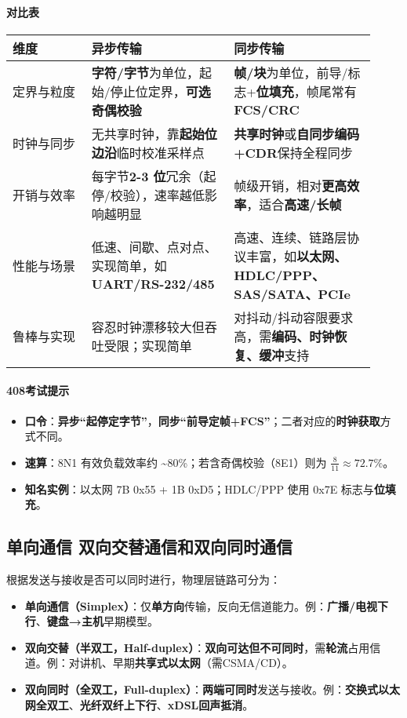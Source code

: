 \documentclass[lang=cn,newtx,10pt,scheme=chinese]{../../elegantbook}
\begin{document}
\paragraph{对比表}
{\small\begin{longtable}{|p{0.20\linewidth}|p{0.36\linewidth}|p{0.36\linewidth}|}
\hline
    	\textbf{维度} & \textbf{异步传输} & \textbf{同步传输} \\
\hline
定界与粒度 & \textbf{字符/字节}为单位，起始/停止位定界，\textbf{可选奇偶校验} & \textbf{帧/块}为单位，前导/标志+\textbf{位填充}，帧尾常有\textbf{FCS/CRC} \\
\hline
时钟与同步 & 无共享时钟，靠\textbf{起始位边沿}临时校准采样点 & \textbf{共享时钟}或\textbf{自同步编码+CDR}保持全程同步 \\
\hline
开销与效率 & 每字节\textbf{2-3 位}冗余（起停/校验），速率越低影响越明显 & 帧级开销，相对\textbf{更高效率}，适合\textbf{高速/长帧} \\
\hline
性能与场景 & 低速、间歇、点对点、实现简单，如\textbf{UART/RS-232/485} & 高速、连续、链路层协议丰富，如\textbf{以太网、HDLC/PPP、SAS/SATA、PCIe} \\
\hline
鲁棒与实现 & 容忍时钟漂移较大但吞吐受限；实现简单 & 对抖动/抖动容限要求高，需\textbf{编码、时钟恢复、缓冲}支持 \\
\hline
\end{longtable}}

\paragraph{408考试提示}
\begin{itemize}
    \item \textbf{口令}：\textbf{异步“起停定字节”}，\textbf{同步“前导定帧+FCS”}；二者对应的\textbf{时钟获取}方式不同。
    \item \textbf{速算}：8N1 有效负载效率约 \textasciitilde80\%；若含奇偶校验（8E1）则为 $\tfrac{8}{11}\approx72.7\%$。
    \item \textbf{知名实例}：以太网 7B 0x55 + 1B 0xD5；HDLC/PPP 使用 0x7E 标志与\textbf{位填充}。
\end{itemize}

\subsection{单向通信 双向交替通信和双向同时通信}
根据发送与接收是否可以同时进行，物理层链路可分为：
\begin{itemize}
    \item \textbf{单向通信（Simplex）}：仅\textbf{单方向}传输，反向无信道能力。例：\textbf{广播/电视下行}、\textbf{键盘→主机}早期模型。
    \item \textbf{双向交替（半双工，Half-duplex）}：\textbf{双向可达但不可同时}，需\textbf{轮流}占用信道。例：对讲机、早期\textbf{共享式以太网}（需CSMA/CD）。
    \item \textbf{双向同时（全双工，Full-duplex）}：\textbf{两端可同时}发送与接收。例：\textbf{交换式以太网全双工}、\textbf{光纤双纤上下行}、\textbf{xDSL回声抵消}。
\end{itemize}
\end{document}

